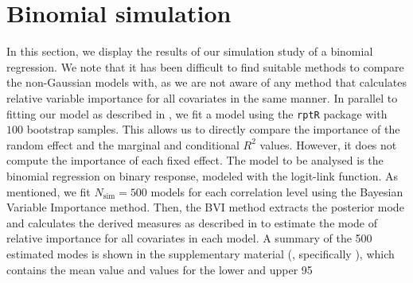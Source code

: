 \section{Binomial simulation}
In this section, we display the results of our simulation study of a binomial regression. We note that it has been difficult to find suitable methods to compare the non-Gaussian models with, as we are not aware of any method that calculates relative variable importance for all covariates in the same manner. In parallel to fitting our model as described in , we fit a model using the \texttt{rptR} package with $100$ bootstrap samples. This allows us to directly compare the importance of the random effect and the marginal and conditional $R^2$ values. However, it does not compute the importance of each fixed effect. The model to be analysed is the binomial regression on binary response, modeled with the logit-link function. As mentioned, we fit \( N_{\text{sim}} = 500 \) models for each correlation level using the Bayesian Variable Importance method. Then, the BVI method extracts the posterior mode and calculates the derived measures as described in  to estimate the mode of relative importance for all covariates in each model. A summary of the 500 estimated modes is shown in the supplementary material (, specifically ), which contains the mean value and values for the lower and upper 95%

